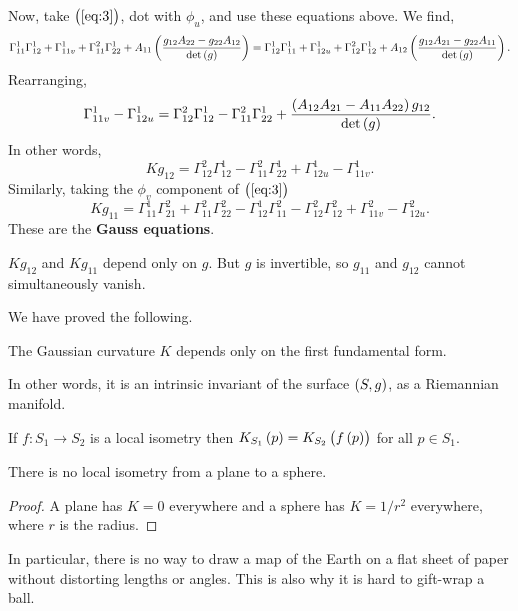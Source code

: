 Now, take $ \br{\ref{eq:3}} $, dot with $ \phi_u $, and use these equations above. We find,
$$ \Gamma_{11}^1\Gamma_{12}^1 + \Gamma_{11v}^1 + \Gamma_{11}^2\Gamma_{22}^1 + A_{11}\br{\dfrac{g_{12}A_{22} - g_{22}A_{12}}{\det\br{g}}} = \Gamma_{12}^1\Gamma_{11}^1 + \Gamma_{12u}^1 + \Gamma_{12}^2\Gamma_{12}^1 + A_{12}\br{\dfrac{g_{12}A_{21} - g_{22}A_{11}}{\det\br{g}}}. $$
Rearranging,
$$ \Gamma_{11v}^1 - \Gamma_{12u}^1 = \Gamma_{12}^2\Gamma_{12}^1 - \Gamma_{11}^2\Gamma_{22}^1 + \dfrac{\br{A_{12}A_{21} - A_{11}A_{22}}g_{12}}{\det\br{g}}. $$
In other words,
$$ Kg_{12} = \Gamma_{12}^2\Gamma_{12}^1 - \Gamma_{11}^2\Gamma_{22}^1 + \Gamma_{12u}^1 - \Gamma_{11v}^1. $$
Similarly, taking the $ \phi_v $ component of $ \br{\ref{eq:3}} $
$$ Kg_{11} = \Gamma_{11}^1\Gamma_{21}^2 + \Gamma_{11}^2\Gamma_{22}^2 - \Gamma_{12}^1\Gamma_{11}^2 - \Gamma_{12}^2\Gamma_{12}^2 + \Gamma_{11v}^2 - \Gamma_{12u}^2. $$
These are the \textbf{Gauss equations}.

\begin{note*}
$ Kg_{12} $ and $ Kg_{11} $ depend only on $ g $. But $ g $ is invertible, so $ g_{11} $ and $ g_{12} $ cannot simultaneously vanish.
\end{note*}

We have proved the following.

\begin{theorem}
The Gaussian curvature $ K $ depends only on the first fundamental form.
\end{theorem}

In other words, it is an intrinsic invariant of the surface $ \br{S, g} $, as a Riemannian manifold.

\pagebreak

\begin{corollary}
If $ f : S_1 \to S_2 $ is a local isometry then $ K_{S_1}\br{p} = K_{S_2}\br{f\br{p}} $ for all $ p \in S_1 $.
\end{corollary}

\begin{corollary}
There is no local isometry from a plane to a sphere.
\end{corollary}

\begin{proof}
A plane has $ K = 0 $ everywhere and a sphere has $ K = 1 / r^2 $ everywhere, where $ r $ is the radius.
\end{proof}

In particular, there is no way to draw a map of the Earth on a flat sheet of paper without distorting lengths or angles. This is also why it is hard to gift-wrap a ball.

